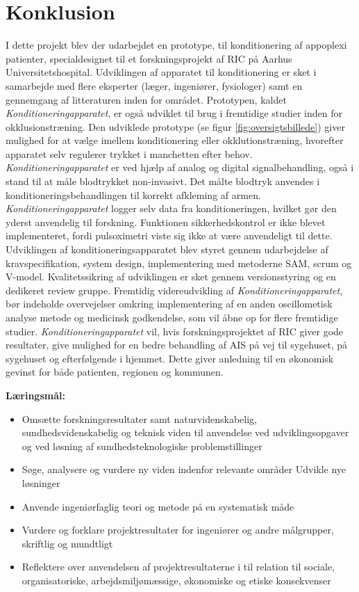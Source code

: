 \chapter{Konklusion}
I dette projekt blev der udarbejdet en prototype, til konditionering af appoplexi patienter, specialdesignet til et forskningsprojekt af RIC på Aarhus Universitetshospital. Udviklingen af apparatet til konditionering er sket i samarbejde med flere eksperter (læger, ingeniører, fysiologer) samt en gennemgang af litteraturen inden for området. Prototypen, kaldet \textit{Konditioneringapparatet}, er også udviklet til brug i fremtidige studier inden for okklusionstræning.
Den udviklede prototype (se figur \ref{fig:oversigtsbillede}) giver mulighed for at vælge imellem konditionering eller okklutionstræning, hvorefter apparatet selv regulerer trykket i manchetten efter behov. \textit{Konditioneringapparatet} er ved hjælp af analog og digital signalbehandling, også i stand til at måle blodtrykket non-invasivt. Det målte blodtryk anvendes i konditioneringsbehandlingen til korrekt afkleming af armen. \textit{Konditioneringapparatet} logger selv data fra konditioneringen, hvilket gør den yderst anvendelig til forskning. Funktionen sikkerhedskontrol er ikke blevet implementeret, fordi pulsoximetri viste sig ikke at være anvendeligt til dette.
Udviklingen af konditioneringsapparatet blev styret gennem udarbejdelse af kravspecifikation, system design, implementering med metoderne SAM, scrum og V-model. Kvalitetssikring af udviklingen er sket gennem versionsstyring og en dedikeret review gruppe.
Fremtidig videreudvikling af \textit{Konditioneringapparatet}, bør indeholde overvejelser omkring implementering af en anden oscillometisk analyse metode og medicinsk godkendelse, som vil åbne op for flere fremtidige studier.
\textit{Konditioneringapparatet} vil, hvis forskningsprojektet af RIC giver gode resultater, give mulighed for en bedre behandling af AIS på vej til sygehuset, på sygehuset og efterfølgende i hjemmet. Dette giver anledning til en økonomisk gevinst for både patienten, regionen og kommunen. 

\label{SidsteSide}

\textbf{Læringsmål:}
\begin{itemize}
	\item Omsætte forskningsresultater samt naturvidenskabelig, sundhedsvidenskabelig og teknisk viden til anvendelse ved udviklingsopgaver og ved løsning af sundhedsteknologiske problemstillinger
	\item Søge, analysere og vurdere ny viden indenfor relevante områder
	Udvikle nye løsninger
	\item Anvende ingeniørfaglig teori og metode på en systematisk måde
	\item Vurdere og forklare projektresultater for ingeniører og andre målgrupper, skriftlig og mundtligt
	
	\item Reflektere over anvendelsen af projektresultaterne i til relation til sociale, organisatoriske, arbejdsmiljømæssige, økonomiske og etiske konsekvenser
\end{itemize}




